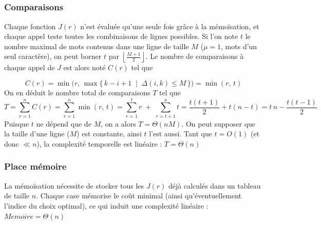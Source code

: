 \documentclass[10pt]{article}
\begin{document}
\subsection{}
\subsubsection*{Comparaisons}
Chaque fonction \(J(r)\) n’est évaluée qu’une seule fois grâce à la mémoïsation, et chaque appel teste toutes les combinaisons de lignes possibles. Si l’on note \(t\) le nombre maximal de mots contenus dans une ligne de taille \(M\) (\(\mu = 1\), mots d’un seul caractère), on peut borner \(t\) par \(\left\lfloor \tfrac{M + 1}{2} \right\rfloor\). Le nombre de comparaisons à chaque appel de \(J\) est alors noté \(C(r)\) tel que

\[
C(r) = \min\!\Big(r,\,\max\{\,k - i + 1 \;\mid\; \Delta(i,k) \le M\,\}\Big)
       = \min(r,\,t)
\]
On en déduit le nombre total de comparaisons \(T\) tel que
\[
T = \sum_{r=1}^{n} C(r)
   = \sum_{r=1}^{n} \min(r,\,t)
   = \sum_{r=1}^{t} r \;+\; \sum_{r=t+1}^{n} t
   = \frac{t(t+1)}{2} + t(n-t)
   = t\,n - \frac{t(t-1)}{2}
\]
Puisque \(t\) ne dépend que de \(M\), on a alors \(T = \Theta(nM)\). On peut supposer que la taille d'une ligne  (\(M\)) est constante, ainsi \(t\) l’est aussi. Tant que \(t = O(1)\) (et donc \(\ll n\)), la complexité temporelle est linéaire :
\(
\boxed{T = \Theta(n)}
\)

\subsubsection*{Place mémoire}
La mémoïsation nécessite de stocker tous les \(J(r)\) déjà calculés dans un tableau de taille \(n\). Chaque case mémorise le coût minimal (ainsi qu'éventuellement l’indice du choix optimal), 
ce qui induit une complexité linéaire :
\(
\boxed{Memoire = \Theta(n)}
\)
\end{document}
